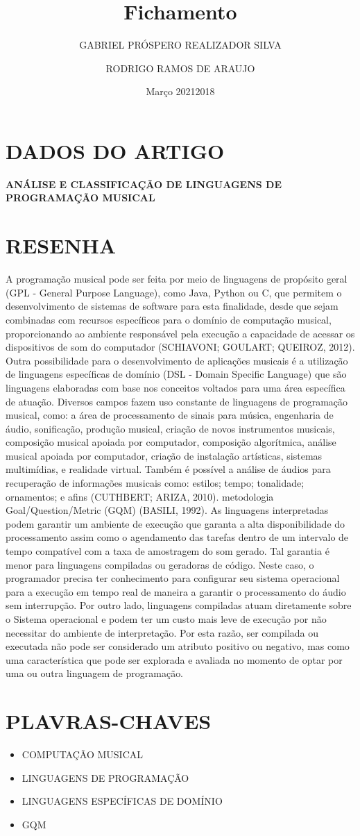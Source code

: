 \documentclass{article}
\title{Fichamento}
\author{GABRIEL PRÓSPERO REALIZADOR  SILVA}
\date{Março 2021}
\begin{document}
\maketitle

\section{DADOS DO ARTIGO}
\textbf{ANÁLISE E CLASSIFICAÇÃO DE LINGUAGENS DE PROGRAMAÇÃO MUSICAL \\}
\author{RODRIGO RAMOS DE ARAUJO \\}
\date{2018}

\section{RESENHA}
 A programação musical pode ser feita por meio de linguagens de propósito geral (GPL - General Purpose Language), como Java, Python ou C, que permitem o desenvolvimento de sistemas de software para esta finalidade, desde que sejam combinadas com recursos específicos para o domínio de computação musical, proporcionando ao ambiente responsável pela execução a capacidade de acessar os dispositivos de som do computador (SCHIAVONI; GOULART; QUEIROZ, 2012). Outra possibilidade para o desenvolvimento de aplicações musicais é a utilização de linguagens específicas de domínio (DSL - Domain Specific Language) que são linguagens elaboradas com base nos conceitos voltados para uma área específica de atuação. Diversos campos fazem uso constante de linguagens de programação musical, como: a área de processamento de sinais para música, engenharia de áudio, sonificação, produção musical, criação de novos instrumentos musicais, composição musical apoiada por computador, composição algorítmica, análise musical apoiada por computador, criação de instalação artísticas, sistemas multimídias, e realidade virtual. Também é possível a análise de áudios para recuperação de informações musicais como: estilos; tempo; tonalidade; ornamentos; e afins (CUTHBERT; ARIZA, 2010). metodologia Goal/Question/Metric (GQM) (BASILI, 1992). As linguagens interpretadas podem garantir um ambiente de execução que garanta a alta disponibilidade do processamento assim como o agendamento das tarefas dentro de um intervalo de tempo compatível com a taxa de amostragem do som gerado. Tal garantia é menor para linguagens compiladas ou geradoras de código. Neste caso, o programador precisa ter conhecimento para configurar seu sistema operacional para a execução em tempo real de maneira a garantir o processamento do áudio sem interrupção. Por outro lado, linguagens compiladas atuam diretamente sobre o Sistema operacional e podem ter um custo mais leve de execução por não necessitar do ambiente de interpretação. Por esta razão, ser compilada ou executada não pode ser considerado um atributo positivo ou negativo, mas como uma característica que pode ser explorada e avaliada no momento de optar por uma ou outra linguagem de programação. 

\section{PLAVRAS-CHAVES}
\begin{itemize}
    \item COMPUTAÇÃO MUSICAL
    \item LINGUAGENS DE PROGRAMAÇÃO
    \item LINGUAGENS ESPECÍFICAS DE DOMÍNIO
    \item GQM
\end{itemize}
\end{document}
